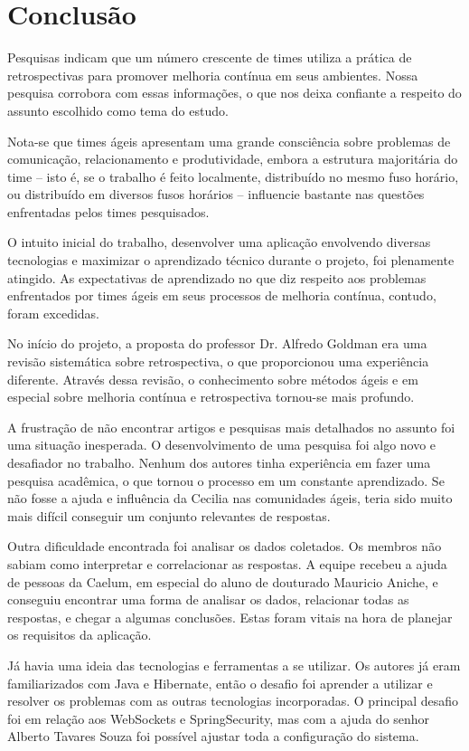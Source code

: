 \section{Conclusão}

Pesquisas indicam que um número crescente de times utiliza a prática de retrospectivas para promover melhoria contínua em seus ambientes. Nossa pesquisa corrobora com essas informações, o que nos deixa confiante a respeito do assunto escolhido como tema do estudo.

Nota-se que times ágeis apresentam uma grande consciência sobre problemas de comunicação, relacionamento e produtividade, embora a estrutura majoritária do time -- isto é, se o trabalho é feito localmente, distribuído no mesmo fuso horário, ou distribuído em diversos fusos horários -- influencie bastante nas questões enfrentadas pelos times pesquisados.

O intuito inicial do trabalho, desenvolver uma aplicação envolvendo diversas tecnologias e maximizar o aprendizado técnico durante o projeto, foi plenamente atingido. As expectativas de aprendizado no que diz respeito aos problemas enfrentados por times ágeis em seus processos de melhoria contínua, contudo, foram excedidas.

No início do projeto, a proposta do professor Dr. Alfredo Goldman era uma revisão sistemática sobre retrospectiva, o que proporcionou uma experiência diferente. Através dessa revisão, o conhecimento sobre métodos ágeis e em especial sobre melhoria contínua e retrospectiva tornou-se mais profundo.

A frustração de não encontrar artigos e pesquisas mais detalhados no assunto foi uma situação inesperada. O desenvolvimento de uma pesquisa foi algo novo e desafiador no trabalho. Nenhum dos autores tinha experiência em fazer uma pesquisa acadêmica, o que tornou o processo em um constante aprendizado. Se não fosse a ajuda e influência da Cecilia nas comunidades ágeis, teria sido muito mais difícil conseguir um conjunto relevantes de respostas.

Outra dificuldade encontrada foi analisar os dados coletados. Os membros não sabiam como interpretar e correlacionar as respostas. A equipe recebeu a ajuda de pessoas da Caelum, em especial do aluno de douturado Mauricio Aniche, e conseguiu encontrar uma forma de analisar os dados, relacionar todas as respostas, e chegar a algumas conclusões. Estas foram vitais na hora de planejar os requisitos da aplicação.

Já havia uma ideia das tecnologias e ferramentas a se utilizar. Os autores já eram familiarizados com Java e Hibernate, então o desafio foi aprender a utilizar e resolver os problemas com as outras tecnologias incorporadas. O principal desafio foi em relação aos WebSockets e SpringSecurity, mas com a ajuda do senhor Alberto Tavares Souza foi possível ajustar toda a configuração do sistema.

